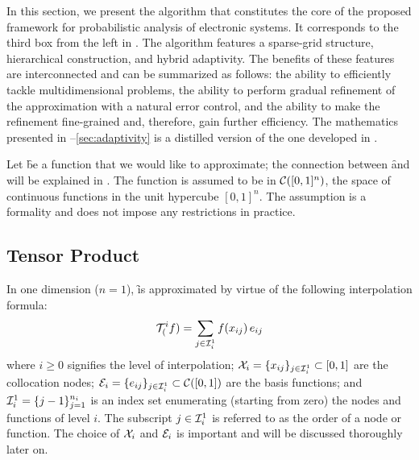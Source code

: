 In this section, we present the algorithm that constitutes the core of the
proposed framework for probabilistic analysis of electronic systems. It
corresponds to the third box from the left in . The algorithm
features a sparse-grid structure, hierarchical construction, and hybrid
adaptivity. The benefits of these features are interconnected and can be
summarized as follows: the ability to efficiently tackle multidimensional
problems, the ability to perform gradual refinement of the approximation with a
natural error control, and the ability to make the refinement fine-grained and,
therefore, gain further efficiency. The mathematics presented in
--\ref{sec:adaptivity} is a distilled version of the one developed
in \cite{jakeman2012, klimke2006, ma2009}.

Let \f be a function that we would like to approximate; the connection between
\f and \g will be explained in . The function is assumed to be in
$\mathcal{C}([0, 1]^n)$, the space of continuous functions in the unit hypercube
$[0, 1]^n$. The assumption is a formality and does not impose any restrictions
in practice.

\subsection{Tensor Product}

In one dimension ($n = 1$), \f is approximated by virtue of the following
interpolation formula:
\[
  \mathcal{T}^{i}_{(}f) = \sum_{j \in \mathcal{I}^{1}_{i}} f(x_{ij}) \, e_{ij}
\]
where $i \geq 0$ signifies the level of interpolation; $\mathcal{X}_i = \{ x_{ij} \}_{j
\in \mathcal{I}^{1}_{i}} \subset [0, 1]$ are the collocation nodes; $\mathcal{E}_i = \{
e_{ij} \}_{j \in \mathcal{I}^{1}_{i}} \subset \mathcal{C}([0, 1])$ are the basis
functions; and $\mathcal{I}^{1}_{i} = \{ j - 1 \}_{j = 1}^{n_i}$ is an index set
enumerating (starting from zero) the nodes and functions of level $i$. The
subscript $j \in \mathcal{I}^{1}_{i}$ is referred to as the order of a node or
function. The choice of $\mathcal{X}_i$ and $\mathcal{E}_i$ is important and will be discussed
thoroughly later on.

